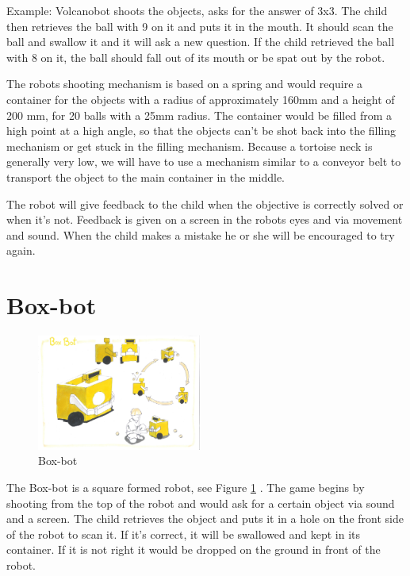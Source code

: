 \documentclass[11pt,twoside,a4paper]{report}
\begin{document}
Example: Volcanobot shoots the objects, asks for the answer of 3x3. The child then retrieves the ball with 9 on it and puts it in the mouth. It should scan the ball and swallow it and it will ask a new question. If the child retrieved the ball with 8 on it, the ball should fall out of its mouth or be spat out by the robot.

The robots shooting mechanism is based on a spring and would require a container for the objects with a radius of approximately 160mm and a height of 200 mm, for 20 balls with a 25mm radius. The container would be filled from a high point at a high angle, so that the objects can\rq{}t be shot back into the filling mechanism or get stuck in the filling mechanism. Because a tortoise neck is generally very low, we will have to use a mechanism similar to a conveyor belt to transport the object to the main container in the middle.

The robot will give feedback to the child when the objective is correctly solved or when it\rq{}s not. Feedback is given on a screen in the robots eyes and via movement and sound. When the child makes a mistake he or she will be encouraged to try again.

\section{Box-bot}
\begin{figure}
  \begin{center}
    \includegraphics[width=0.48\textwidth]{Images/BoxBotConcept.pdf}
  \end{center}
  \caption{Box-bot}
  \label{figure:boxbot}
\end{figure}
The Box-bot is a square formed robot, see Figure \ref{figure:boxbot} . The game begins by shooting from the top of the robot and would ask for a certain object via sound and a screen. The child retrieves the object and puts it in a hole on the front side of the robot to scan it. If it\rq{}s correct, it will be swallowed and kept in its container. If it is not right it would be dropped on the ground in front of the robot.
\end{document}
